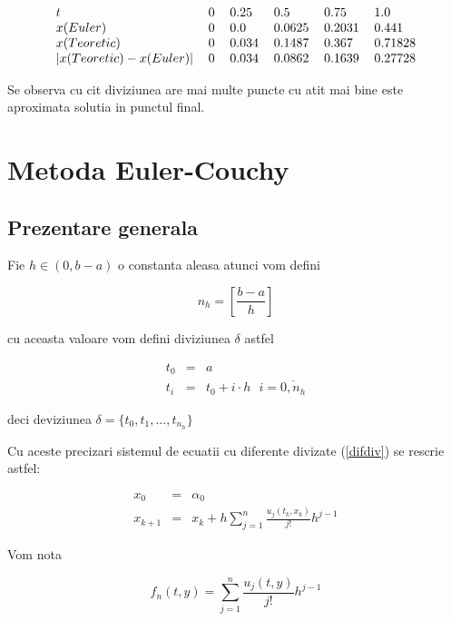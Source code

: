 \documentclass[a4paper,twoside]{book}
\begin{document}
\begin{equation*}
\begin{tabular}{llllll}
$t$ & 0 & 0.25 & 0.5 & 0.75 & 1.0 \\ 
$x(Euler)$ & 0 & 0.0 & 0.0625 & 0.2031 & 0.441 \\ 
$x(Teoretic)$ & 0 & 0.034 & 0.1487 & 0.367 & 0.71828 \\ 
$\left\vert x(Teoretic)-x(Euler)\right\vert $ & 0 & 0.034 & 0.0862 & 0.1639
& 0.27728%
\end{tabular}%
\end{equation*}

Se observa cu cit diviziunea are mai multe puncte cu atit mai bine este
aproximata solutia in punctul final.

\chapter{Metoda Euler-Couchy}

\section{Prezentare generala}

\bigskip Fie $h\in (0,b-a)$ o constanta aleasa atunci vom defini

\begin{equation*}
n_{h}=\left[ \frac{b-a}{h}\right]
\end{equation*}

cu aceasta valoare vom defini diviziunea $\delta $ astfel

\begin{eqnarray*}
t_{0} &=&a \\
t_{i} &=&t_{0}+i\cdot h\,\,\,\,i=\overline{0,n_{h}}
\end{eqnarray*}

deci deviziunea $\delta =\{t_{0},t_{1},...,t_{n_{h}}\}$

Cu aceste precizari sistemul de ecuatii cu diferente divizate (\ref{difdiv})
se rescrie astfel:

\begin{eqnarray*}
x_{0} &=&\alpha _{0} \\
x_{k+1} &=&x_{k}+h\sum_{j=1}^{n}\frac{u_{j}(t_{k},x_{k})}{j!}h^{j-1}
\end{eqnarray*}

Vom nota

\begin{equation*}
f_{n}(t,y)=\sum_{j=1}^{n}\frac{u_{j}(t,y)}{j!}h^{j-1}
\end{equation*}
\end{document}
